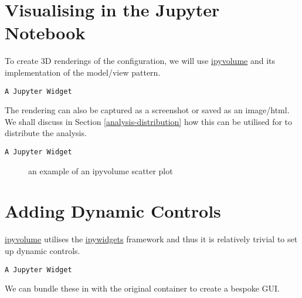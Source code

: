 \documentclass[10pt,parskip=half,
	toc=sectionentrywithdots,
	bibliography=totocnumbered,
	captions=tableheading,numbers=noendperiod]{scrartcl}
\begin{document}
\section{Visualising in the Jupyter
Notebook}\label{visualising-in-the-jupyter-notebook}

To create 3D renderings of the configuration, we will use
\href{http://ipyvolume.readthedocs.io}{ipyvolume} and its implementation
of the model/view pattern.

\begin{lstlisting}[language={},postbreak={},numbers=none,xrightmargin=7pt,breakindent=0pt,aboveskip=5pt,belowskip=5pt]
A Jupyter Widget
\end{lstlisting}

The rendering can also be captured as a screenshot or saved as an
image/html. We shall discuss in Section \ref{analysis-distribution} how
this can be utilised for to distribute the analysis.

\begin{lstlisting}[language={},postbreak={},numbers=none,xrightmargin=7pt,breakindent=0pt,aboveskip=5pt,belowskip=5pt]
A Jupyter Widget
\end{lstlisting}

\begin{figure}[H]\begin{center}\end{center}\caption{an example of an ipyvolume scatter plot}\label{fig:ipyvol1}
    \end{figure}

\section{Adding Dynamic Controls}\label{adding-dynamic-controls}

\href{http://ipyvolume.readthedocs.io}{ipyvolume} utilises the
\href{http://ipywidgets.readthedocs.io}{ipywidgets} framework and thus
it is relatively trivial to set up dynamic controls.

\begin{lstlisting}[language={},postbreak={},numbers=none,xrightmargin=7pt,breakindent=0pt,aboveskip=5pt,belowskip=5pt]
A Jupyter Widget
\end{lstlisting}

We can bundle these in with the original container to create a bespoke
GUI.
\end{document}
